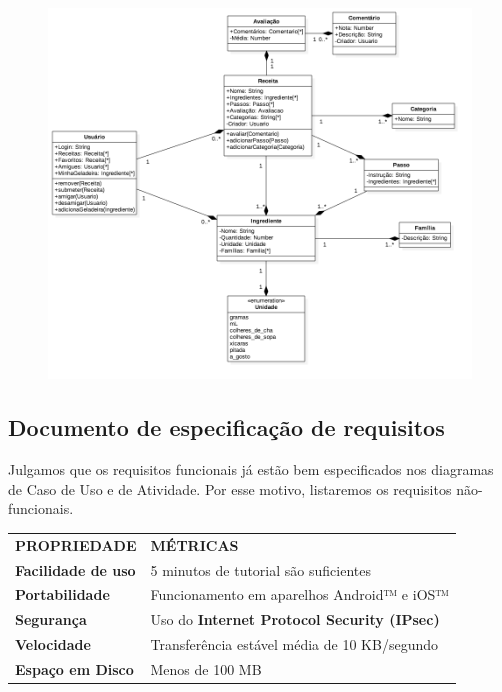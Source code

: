 \documentclass[paper=a4, fontsize=11pt]{scrartcl}	%
\numberwithin{equation}{section}															%
\numberwithin{figure}{section}																%
\numberwithin{table}{section}																%
\begin{document}
\begin{figure}[h!]
	\centerline{
	\includegraphics[scale=0.4]{UML.png}
	}
\end{figure}


\newpage
\subsection{Documento de especificação de requisitos}

Julgamos que os requisitos funcionais já estão bem especificados nos diagramas de Caso de Uso e de Atividade. Por esse motivo, listaremos os requisitos não-funcionais.

\begin{center}
\begin{tabular}{l l}
  \textbf{PROPRIEDADE} & \textbf{MÉTRICAS} \\
  \cline{1-2}
	\textbf{Facilidade de uso} & 5 minutos de tutorial são suficientes \\
	\textbf{Portabilidade} & Funcionamento em aparelhos Android™ e iOS™ \\
	\textbf{Segurança} & Uso do \textbf{Internet Protocol Security (IPsec)} \\
	\textbf{Velocidade} & Transferência estável média de 10 KB/segundo \\
	\textbf{Espaço em Disco} & Menos de 100 MB
\end{tabular}
\end{center}
\end{document}
